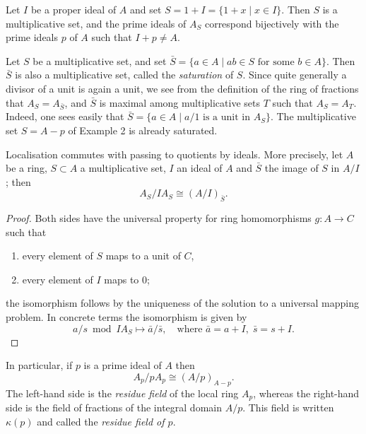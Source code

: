 \begin{example}\label{ex:4.3}
Let $I$ be a proper ideal of $A$ and set $S = 1 + I = \{1 + x \mid
x \in I\}$. Then $S$ is a multiplicative set, and the prime ideals of $A_S$
correspond bijectively with the prime ideals $p$ of $A$ such that $I + p \neq A$.
\end{example}

\begin{example}\label{ex:4.4}
Let $S$ be a multiplicative set, and set $\bar{S} = \{a \in A \mid ab \in S \text{ for
some } b \in A\}$. Then $\bar{S}$ is also a multiplicative set, called the \emph{saturation}
of $S$. Since quite generally a divisor of a unit is again a unit, we see from
the definition of the ring of fractions that $A_S = A_{\bar{S}}$, and $\bar{S}$ is maximal among
multiplicative sets $T$ such that $A_S = A_T$. Indeed, one sees easily that $\bar{S} =
\{a \in A \mid a/1 \text{ is a unit in } A_S\}$. The multiplicative set $S = A - p$ of
Example 2 is already saturated.
\end{example}

\begin{theorem}\label{thm:4.2}
Localisation commutes with passing to quotients by ideals.
More precisely, let $A$ be a ring, $S \subset A$ a multiplicative set, $I$ an ideal of $A$
and $\bar{S}$ the image of $S$ in $A/I$; then
\[
  A_S/IA_S \cong (A/I)_{\bar{S}}.
\]
\end{theorem}

\begin{proof}
Both sides have the universal property for ring homomorphisms
$g\colon A \to C$ such that
\begin{enumerate}[(1)]
  \item every element of $S$ maps to a unit of $C$,
  \item every element of $I$ maps to $0$;
\end{enumerate}
the isomorphism follows by the uniqueness of the solution to a universal
mapping problem. In concrete terms the isomorphism is given by
\[
  a/s \bmod IA_S \mapsto \bar{a}/\bar{s}, \quad \text{where } \bar{a} = a + I, \; \bar{s} = s + I.
\]
\end{proof}

In particular, if $p$ is a prime ideal of $A$ then
\[
  A_p/pA_p \cong (A/p)_{A-p}.
\]
The left-hand side is the \emph{residue field} of the local ring $A_p$, whereas the
right-hand side is the field of fractions of the integral domain $A/p$. This
field is written $\kappa(p)$ and called the \emph{residue field of $p$}.

